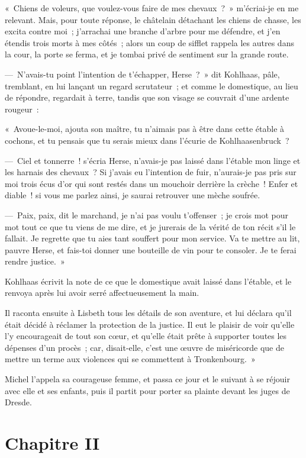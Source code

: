 \documentclass[french,twoside]{book} %
\newcommand\chapteropen{} %
\newcommand\chapterclose{} %
\begin{document}
« Chiens de voleurs, que voulez-vous faire de mes chevaux ? » m’écriai-je en me relevant. Mais, pour toute réponse, le châtelain détachant les chiens de chasse, les excita contre moi ; j’arrachai une branche d’arbre pour me défendre, et j’en étendis trois morts à mes côtés ; alors un coup de sifflet rappela les autres dans la cour, la porte se ferma, et je tombai privé de sentiment sur la grande route.\par
— N’avais-tu point l’intention de t’échapper, Herse ? » dit Kohlhaas, pâle, tremblant, en lui lançant un regard scrutateur ; et comme le domestique, au lieu de répondre, regardait à terre, tandis que son visage se couvrait d’une ardente rougeur :\par
« Avoue-le-moi, ajouta son maître, tu n’aimais pas à être dans cette étable à cochons, et tu pensais que tu serais mieux dans l’écurie de Kohlhaasenbruck ?\par
— Ciel et tonnerre ! s’écria Herse, n’avais-je pas laissé dans l’étable mon linge et les harnais des chevaux ? Si j’avais eu l’intention de fuir, n’aurais-je pas pris sur moi trois écus d’or qui sont restés dans un mouchoir derrière la crèche ! Enfer et diable ! si vous me parlez ainsi, je saurai retrouver une mèche soufrée.\par
— Paix, paix, dit le marchand, je n’ai pas voulu t’offenser ; je crois mot pour mot tout ce que tu viens de me dire, et je jurerais de la vérité de ton récit s’il le fallait. Je regrette que tu aies tant souffert pour mon service. Va te mettre au lit, pauvre Herse, et fais-toi donner une bouteille de vin pour te consoler. Je te ferai rendre justice. »\par
Kohlhaas écrivit la note de ce que le domestique avait laissé dans l’étable, et le renvoya après lui avoir serré affectueusement la main.\par
Il raconta ensuite à Lisbeth tous les détails de son aventure, et lui déclara qu’il était décidé à réclamer la protection de la justice. Il eut le plaisir de voir qu’elle l’y encourageait de tout son cœur, et qu’elle était prête à supporter toutes les dépenses d’un procès ; car, disait-elle, c’est une œuvre de miséricorde que de mettre un terme aux violences qui se commettent à Tronkenbourg. »\par
Michel l’appela sa courageuse femme, et passa ce jour et le suivant à se réjouir avec elle et ses enfants, puis il partit pour porter sa plainte devant les juges de Dresde.
\chapterclose


\chapteropen
\chapter[Chapitre II]{Chapitre II}\renewcommand{\leftmark}{Chapitre II}
\end{document}
